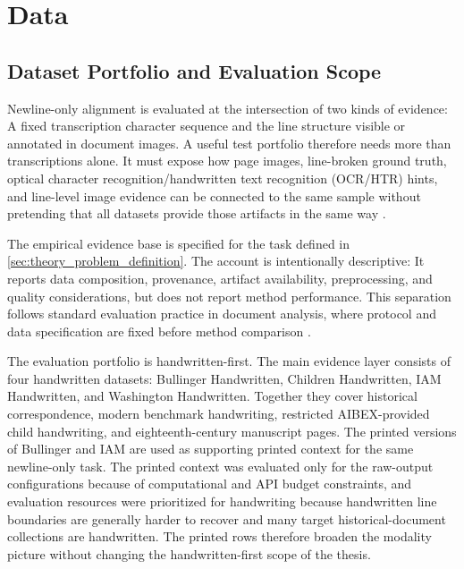 
\chapter{Data}
\label{cha:data}

\section{Dataset Portfolio and Evaluation Scope}
\label{sec:data_portfolio}
\label{sec:data_scope_role}

Newline-only alignment is evaluated at the intersection of two kinds of evidence: A fixed transcription character sequence and the line structure visible or annotated in document images. A useful test portfolio therefore needs more than transcriptions alone. It must expose how page images, line-broken ground truth, optical character recognition/handwritten text recognition (OCR/HTR) hints, and line-level image evidence can be connected to the same sample without pretending that all datasets provide those artifacts in the same way .

The empirical evidence base is specified for the task defined in \autoref{sec:theory_problem_definition}. The account is intentionally descriptive: It reports data composition, provenance, artifact availability, preprocessing, and quality considerations, but does not report method performance. This separation follows standard evaluation practice in document analysis, where protocol and data specification are fixed before method comparison .

The evaluation portfolio is handwritten-first. The main evidence layer consists of four handwritten datasets: Bullinger Handwritten, Children Handwritten, IAM Handwritten, and Washington Handwritten. Together they cover historical correspondence, modern benchmark handwriting, restricted AIBEX-provided child handwriting, and eighteenth-century manuscript pages. The printed versions of Bullinger and IAM are used as supporting printed context for the same newline-only task. The printed context was evaluated only for the raw-output configurations because of computational and API budget constraints, and evaluation resources were prioritized for handwriting because handwritten line boundaries are generally harder to recover and many target historical-document collections are handwritten. The printed rows therefore broaden the modality picture without changing the handwritten-first scope of the thesis.

